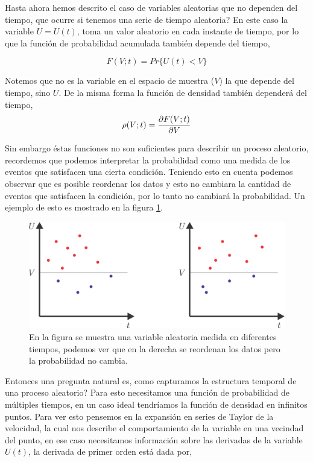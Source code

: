 \documentclass[executivepaper,12pt]{article}
\numberwithin{equation}{section}
\begin{document}
Hasta ahora hemos descrito el caso de variables aleatorias que no dependen del tiempo, que ocurre si tenemos una serie de tiempo aleatoria? En este caso la variable $U=U(t)$, toma un valor aleatorio  en cada instante de tiempo, por lo que la función de probabilidad acumulada también depende del tiempo,


\begin{equation*}
	F(V;t)=Pr\{U(t)<V\}
\end{equation*}

Notemos que no es la variable en el espacio de muestra ($V$) la que depende del tiempo, sino $U$. De la misma forma la función de densidad también dependerá del tiempo,
\begin{equation*}
	\rho(V;t)=\pdv{F(V;t)}{V}
\end{equation*} 

Sin embargo éstas funciones no son suficientes para describir un proceso aleatorio, recordemos que podemos interpretar la probabilidad como una medida de los eventos que satisfacen una cierta condición. Teniendo esto en cuenta podemos observar que es posible reordenar los datos y esto no cambiara la cantidad de eventos que satisfacen la condición, por lo tanto no cambiará la probabilidad. Un ejemplo de esto es mostrado en la figura \ref{fig-prob4}.


\begin{figure}[H]
	\begin{center}
		\includegraphics[scale=1]{probabilidad4}
	\end{center}
	\caption{En la figura se muestra una variable aleatoria medida en diferentes tiempos, podemos ver que en la derecha se reordenan los datos pero la probabilidad no cambia.}
	\label{fig-prob4}
\end{figure}

Entonces una pregunta natural es, como capturamos la estructura temporal de una proceso aleatorio? Para esto necesitamos una función de probabilidad de múltiples tiempos, en un caso ideal tendríamos la función de densidad en infinitos puntos. Para ver esto pensemos en la expansión en series de Taylor de la velocidad, la cual nos describe el comportamiento de la variable en una vecindad del punto, en ese caso necesitamos información sobre las derivadas de la variable $U(t)$, la derivada de primer orden está dada por,
\end{document}
